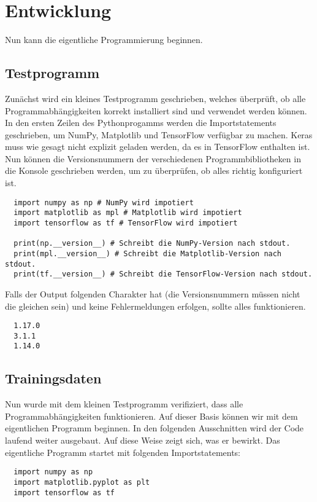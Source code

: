\section{Entwicklung}
Nun kann die eigentliche Programmierung beginnen.

\subsection{Testprogramm}
Zunächst wird ein kleines Testprogramm geschrieben, welches überprüft, ob
alle Programmabhängigkeiten korrekt installiert sind und verwendet werden können.
In den ersten Zeilen des Pythonprogamms werden die Importstatements
geschrieben, um NumPy, Matplotlib und TensorFlow verfügbar zu machen.
Keras muss wie gesagt nicht explizit geladen werden, da es in TensorFlow
enthalten ist.
Nun können die Versionsnummern der verschiedenen Programmbibliotheken
in die Konsole geschrieben werden, um zu überprüfen, ob alles richtig konfiguriert ist.
\begin{verbatim}
  import numpy as np # NumPy wird impotiert
  import matplotlib as mpl # Matplotlib wird impotiert
  import tensorflow as tf # TensorFlow wird impotiert

  print(np.__version__) # Schreibt die NumPy-Version nach stdout.
  print(mpl.__version__) # Schreibt die Matplotlib-Version nach stdout.
  print(tf.__version__) # Schreibt die TensorFlow-Version nach stdout.
\end{verbatim}
Falls der Output folgenden Charakter hat (die Versionsnummern müssen nicht
die gleichen sein) und keine Fehlermeldungen erfolgen, sollte alles funktionieren.
\begin{verbatim}
  1.17.0
  3.1.1
  1.14.0
\end{verbatim}
\para{}

\subsection{Trainingsdaten}
Nun wurde mit dem kleinen Testprogramm verifiziert, dass alle
Programmabhängigkeiten funktionieren. Auf dieser Basis können wir mit dem
eigentlichen Programm beginnen.
\para{}
In den folgenden Ausschnitten wird der Code laufend weiter ausgebaut.
Auf diese Weise zeigt sich, was er bewirkt.
Das eigentliche Programm startet mit folgenden Importstatements:
\begin{verbatim}
  import numpy as np
  import matplotlib.pyplot as plt
  import tensorflow as tf
\end{verbatim}

